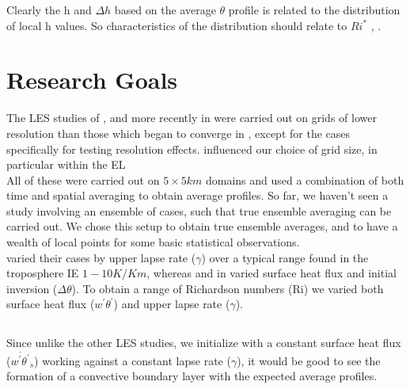 Clearly the h and $\Delta h$ based on the average $\theta$ profile is related to the distribution of local h values. So characteristics of the distribution should relate to $Ri^{*}$ \cite{SullMoengStev}, \cite{BrooksFowler2}.  

\section{Research Goals}
\label{sec:ResearchGoals}

The LES studies of \citeauthor{SullMoengStev} \cite{SullMoengStev}, \citeauthor{FedConzMir04} \cite{FedConzMir04} and more recently \citeauthor{BrooksFowler2} in \cite{BrooksFowler2} were carried out on grids of lower resolution than those which began to converge in \citeauthor{SullPat} \cite{SullPat}, except for the cases specifically for testing resolution effects. \citeauthor{SullPat} \cite{SullPat} influenced our choice of grid size, in particular within the \acs{EL}\\

 All of these were carried out on $5 \times 5 km$ domains and used a combination of both time and spatial averaging to obtain average profiles.  So far, we haven't seen a study involving an ensemble of cases, such that true ensemble averaging can be carried out.  We chose this setup to obtain true ensemble averages, and to have a wealth of local points for some basic statistical observations.\\

\citeauthor{FedConzMir04} \cite{FedConzMir04} varied their cases by upper lapse rate ($\gamma$) over a typical range found in the troposphere IE $1 - 10 K / Km$, whereas \citeauthor{SullMoengStev} \cite{SullMoengStev} and \citeauthor{BrooksFowler2} in \cite{BrooksFowler2} varied surface heat flux and initial inversion ($\Delta \theta$).  To obtain a range of Richardson numbers (\acs{Ri}) we varied both surface heat flux ($w^{'}\theta^{'}$) and upper lapse rate ($\gamma$).\\

\subsection{}

Since unlike the other LES studies, we initialize with a constant surface heat flux ($\overline{w^{'}\theta^{'}}_{s}$) working against a constant lapse rate ($\gamma$), it would be good to see the formation of a convective boundary layer with the expected average profiles.\\

